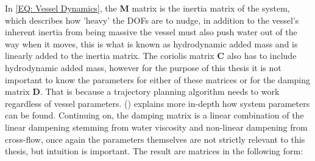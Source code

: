 

In \eqref{EQ: Vessel Dynamics}, the \textbf{M} matrix is the inertia matrix of the system, which describes how 'heavy' the \gls{DOF}s are to nudge, in
addition to the vessel's inherent inertia from being massive the vessel must also push water out of the way when it moves, this is what is known as
hydrodynamic added mass and is linearly added to the inertia matrix. The coriolis matrix \textbf{C} also has to include hydrodynamic added mass,
however for the purpose of this thesis it is not important to know the parameters for either of these matrices or for the damping matrix \textbf{D}.
That is because a trajectory planning algorithm needs to work regardless of vessel parameters. (\cite{pedersen2019optimization}) explains more in-depth
how system parameters can be found. Continuing on, the damping matrix is a linear combination of the linear dampening stemming from water
viscosity and non-linear dampening from cross-flow, once again the parameters themselves are not strictly relevant to this thesis, but intuition is
important. The result are matrices in the following form:

